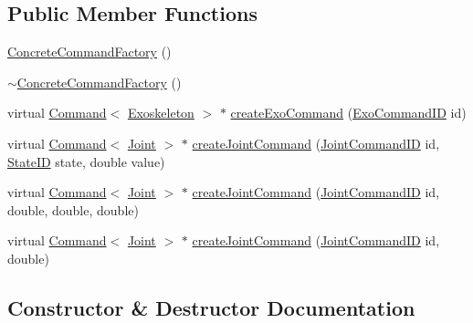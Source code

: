 \subsection*{Public Member Functions}
\begin{DoxyCompactItemize}
\item 
\hyperlink{classConcreteCommandFactory_a03b4c73e1f316aad69c80eb9d6a0b542}{Concrete\+Command\+Factory} ()
\item 
\hyperlink{classConcreteCommandFactory_a3b01f93525176341f57a5869964576d3}{$\sim$\+Concrete\+Command\+Factory} ()
\item 
virtual \hyperlink{classCommand}{Command}$<$ \hyperlink{classExoskeleton}{Exoskeleton} $>$ $\ast$ \hyperlink{classConcreteCommandFactory_a6f7fd417f6959bd0f573ac0127b32631}{create\+Exo\+Command} (\hyperlink{Commands_8hpp_a4a0419b573bf683fef9162331e6ec74e}{Exo\+Command\+ID} id)
\item 
virtual \hyperlink{classCommand}{Command}$<$ \hyperlink{classJoint}{Joint} $>$ $\ast$ \hyperlink{classConcreteCommandFactory_a7ea1fcf9dd01008772c74f1d0fda8253}{create\+Joint\+Command} (\hyperlink{Commands_8hpp_a350356b969551ce1a95947b3cec75d56}{Joint\+Command\+ID} id, \hyperlink{States_8hpp_a26aafbeccd8f356b39e1809f1ab9cfdc}{State\+ID} state, double value)
\item 
virtual \hyperlink{classCommand}{Command}$<$ \hyperlink{classJoint}{Joint} $>$ $\ast$ \hyperlink{classConcreteCommandFactory_a638c86c1d6882d74d1bd53a028235c63}{create\+Joint\+Command} (\hyperlink{Commands_8hpp_a350356b969551ce1a95947b3cec75d56}{Joint\+Command\+ID} id, double, double, double)
\item 
virtual \hyperlink{classCommand}{Command}$<$ \hyperlink{classJoint}{Joint} $>$ $\ast$ \hyperlink{classConcreteCommandFactory_a06e6a5295facfa59451db55af04fc320}{create\+Joint\+Command} (\hyperlink{Commands_8hpp_a350356b969551ce1a95947b3cec75d56}{Joint\+Command\+ID} id, double)
\end{DoxyCompactItemize}


\subsection{Constructor \& Destructor Documentation}
